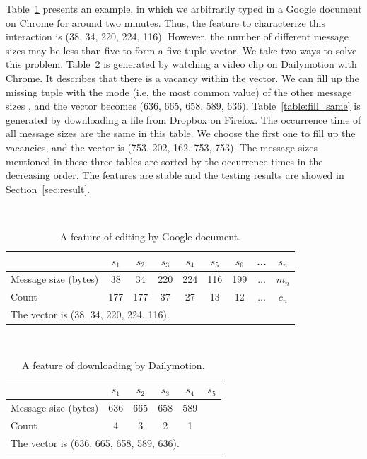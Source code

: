 \documentclass[preprint,12pt]{elsarticle}
\begin{document}
Table~\ref{table:feature_doc} presents an example, in which we arbitrarily typed in a Google document on Chrome for around two minutes. Thus, the feature to characterize this interaction is (38, 34, 220, 224, 116). However, the number of different message sizes may be less than five to form a five-tuple vector. We take two ways to solve this problem. Table~\ref{table:fill_max} is generated by watching a video clip on Dailymotion with Chrome. It describes that there is a vacancy within the vector. We can fill up the missing tuple with the mode (i.e, the most common value) of the other message sizes \cite{DM}, and the vector becomes (636, 665, 658, 589, 636). Table~\ref{table:fill_same} is generated by downloading a file from Dropbox on Firefox. The occurrence time of all message sizes are the same in this table. We choose the first one to fill up the vacancies, and the vector is (753, 202, 162, 753, 753). The message sizes mentioned in these three tables are sorted by the occurrence times in the decreasing order. The features are stable and the testing results are showed in Section~\ref{sec:result}.

\
\begin{table}[H]
\centering
\caption{A feature of editing by Google document.}
\begin{tabular}{|l|c|c|c|c|c|c|c|c|}
\hline  & $s_1$ & $s_2$ & $s_3$ & $s_4$ & $s_5$ & $s_6$ & ... & $s_n$\\
\hline
\hline Message size (bytes) & 38 & 34 & 220 & 224 & 116 & 199 & ... & $m_n$ \\
\hline Count & 177 & 177 & 37 & 27 & 13 & 12 & ... & $c_n$\\
\hline 
\multicolumn{9}{l}{The vector is (38, 34, 220, 224, 116).}\\
\end{tabular}
\label{table:feature_doc}
\end{table}

\
\begin{table}[H]
\centering
\caption{A feature of downloading by Dailymotion.}
\begin{tabular}{|l|c|c|c|c|c|}
\hline  & $s_1$ & $s_2$ & $s_3$ & $s_4$ & $s_5$ \\
\hline
\hline Message size (bytes) & 636 & 665 & 658 & 589 &\\
\hline Count & 4 & 3 & 2 & 1 &\\
\hline
\multicolumn{6}{l}{The vector is (636, 665, 658, 589, 636).}\\ 
\end{tabular}
\label{table:fill_max}
\end{table}
\end{document}
